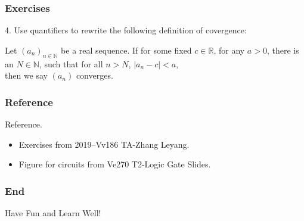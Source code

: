 \documentclass[12pt, t]{beamer}
\begin{document}
\begin{frame}
    \frametitle{Exercises}
4. Use quantifiers to rewrite the following definition of covergence:
\par \vspace{2em} \hspace{1em} Let $(a_n)_{n\in \mathbb{N}}$ be a real sequence. If for some fixed $c \in \mathbb{R}$, 
for any $a>0$, there is an $N\in \mathbb{N}$, such that for all $n>N$, $|a_n-c|<a$,\\ then we
say $(a_n)$ converges.
\end{frame}

\begin{frame}
    \frametitle{Reference}
Reference.
    \begin{itemize}
        \item Exercises from 2019--Vv186 TA-Zhang Leyang.
        \item Figure for circuits from Ve270 T2-Logic Gate Slides.
    \end{itemize}
\end{frame}

\begin{frame}
    \frametitle{End}
    \vspace{2cm}
    \Huge \center  Have Fun and Learn Well!
\end{frame}
\end{document}
